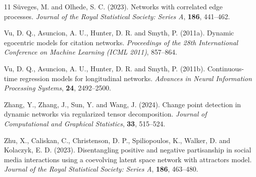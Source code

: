 \documentclass[12pt]{article}
\newcommand{\0}{{\bf 0}}
\begin{document}
\begin{thebibliography}{11}
S\"uveges, M. and Olhede, S. C. (2023). Networks with correlated edge processes. \textit{Journal of the Royal Statistical Society: Series A}, \textbf{186}, 441--462.

Vu, D. Q., Asuncion, A. U., Hunter, D. R. and Smyth, P. (2011a). Dynamic egocentric models for citation networks. \textit{Proceedings of the 28th International Conference on Machine Learning (ICML 2011)}, 857–864.

Vu, D. Q., Asuncion, A. U., Hunter, D. R. and Smyth, P. (2011b). Continuous-time regression models for longitudinal networks. \textit{Advances in Neural Information Processing Systems}, \textbf{24}, 2492–2500.


Zhang, Y., Zhang, J., Sun, Y. and Wang, J. (2024). Change point detection in dynamic networks via regularized tensor decomposition. \textit{Journal of Computational and Graphical Statistics}, \textbf{33}, 515--524.

Zhu, X., Caliskan, C., Christenson, D. P., Spiliopoulos, K., Walker, D. and Kolaczyk, E. D. (2023). Disentangling positive and negative partisanship in social media interactions using a coevolving latent space network with attractors model. \textit{Journal of the Royal Statistical Society: Series A}, \textbf{186}, 463--480.

\end{thebibliography}
\end{document}
